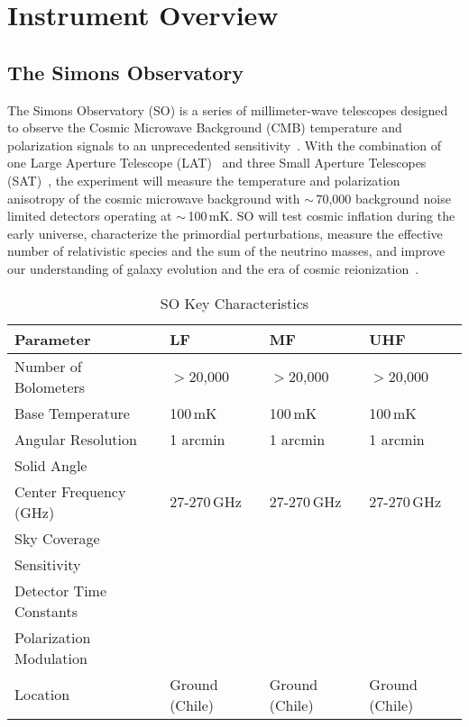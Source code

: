 \chapter{Instrument Overview}
\label{ch:instruments}
\section{The Simons Observatory}

The Simons Observatory (SO) is a series of millimeter-wave telescopes designed to observe the Cosmic Microwave Background (CMB) temperature and polarization signals to an unprecedented sensitivity~\cite{gali18, so19}. With the combination of one Large Aperture Telescope (LAT)~\cite{xu/etal:2020c, zhu18, orlo18, coppi/etal:2018} and three Small Aperture Telescopes (SAT)~\cite{ali20}, the experiment will measure the temperature and polarization anisotropy of the cosmic microwave background with $\sim$\,70,000 background noise limited detectors operating at $\sim$\,100\,mK. SO will test cosmic inflation during the early universe, characterize the primordial perturbations, measure the effective number of relativistic species and the sum of the neutrino masses, and improve our understanding of galaxy evolution and the era of cosmic reionization~\citep{so19}. 

\begin{table}[t]
    \centering
    \begin{tabular}{|l|l|l|l|} \hline
        \textbf{ Parameter} &  \textbf{LF} &  \textbf{MF}  &  \textbf{UHF}  \\ \hline \hline
        Number of Bolometers & $>$20,000& $>$20,000& $>$20,000\\\hline
        Base Temperature & 100\,mK & 100\,mK & 100\,mK\\\hline
        Angular Resolution & 1 arcmin &1 arcmin &1 arcmin\\\hline
        Solid Angle & & &\\\hline
        Center Frequency (GHz) & 27-270\,GHz & 27-270\,GHz & 27-270\,GHz\\\hline
        Sky Coverage & & &\\\hline
        Sensitivity & & &\\\hline
        Detector Time Constants & & & \\\hline
        Polarization Modulation & & &\\\hline
        Location & Ground (Chile)& Ground (Chile)& Ground (Chile)\\
        \hline
    \end{tabular} \caption{SO Key Characteristics}
    \label{tab:so}
\end{table}

